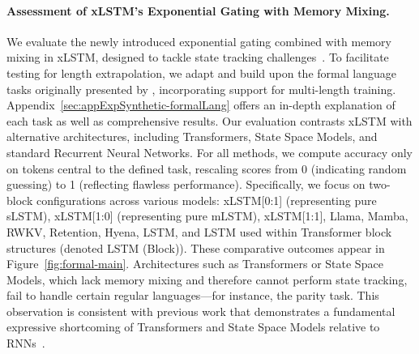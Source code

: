 \paragraph{Assessment of xLSTM's Exponential Gating with Memory Mixing.} We evaluate the newly introduced exponential gating combined with memory mixing in xLSTM, designed to tackle state tracking challenges~\citep{Merrill:24, Merrill:23}. To facilitate testing for length extrapolation, we adapt and build upon the formal language tasks originally presented by \citet{Deletang:23}, incorporating support for multi-length training. Appendix~\ref{sec:appExpSynthetic-formalLang} offers an in-depth explanation of each task as well as comprehensive results. 
Our evaluation contrasts xLSTM with alternative architectures, including Transformers, State Space Models, and standard Recurrent Neural Networks. For all methods, we compute accuracy only on tokens central to the defined task, rescaling scores from 0 (indicating random guessing) to 1 (reflecting flawless performance). Specifically, we focus on two-block configurations across various models: xLSTM[0:1] (representing pure sLSTM), xLSTM[1:0] (representing pure mLSTM), xLSTM[1:1], Llama, Mamba, RWKV, Retention, Hyena, LSTM, and LSTM used within Transformer block structures (denoted LSTM (Block)). These comparative outcomes appear in Figure~\ref{fig:formal-main}.
Architectures such as Transformers or State Space Models, which lack memory mixing and therefore cannot perform state tracking, fail to handle certain regular languages—for instance, the parity task. This observation is consistent with previous work that demonstrates a fundamental expressive shortcoming of Transformers and State Space Models relative to RNNs~\citep{Merrill:24, Merrill:23, Deletang:23}.

